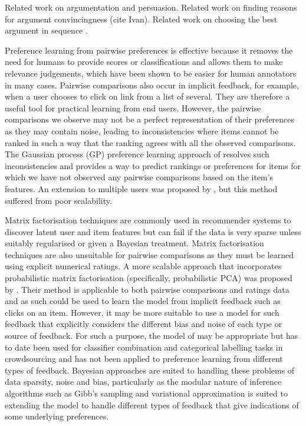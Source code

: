 Related work on argumentation and persuasion. Related work on finding reasons for argument convincingness (cite Ivan). Related work on choosing the best argument in sequence \cite{rosenfeld2016providing}\cite{monteserin2013reinforcement}. 

Preference learning from pairwise preferences is effective because it removes the need for humans to provide scores or classifications and allows them to make relevance judgements,
which have been shown to be easier for human annotators in many cases\cite{brochu_active_2007}. Pairwise comparisons also occur in implicit feedback, for example, when a user chooses to click on link from a list of several. They are therefore a useful tool for practical learning from end users. 
However, the pairwise comparisons we observe may not be a perfect representation of their preferences as they may contain noise, leading to inconsistencies where items cannot be ranked in such a way that the ranking agrees with all the observed comparisons. 
The Gaussian process (GP) preference learning approach of \cite{chu2005preference} resolves such inconsistencies and provides a way to predict rankings or preferences for 
items for which we have not observed any pairwise comparisons based on the item's features. 
An extension to multiple users was proposed by \cite{houlsby2012collaborative}, 
but this method suffered from poor scalability.

Matrix factorisation techniques are commonly used in recommender systems to discover latent
user and item features but can fail if the
data is very sparse unless suitably regularised or given a Bayesian treatment.
Matrix factorisation techniques are also unsuitable for pairwise comparisons as they 
must be learned using explicit numerical ratings.
A more scalable approach that incorporates probabilistic matrix factorisation
(specifically, probabilistic PCA) was proposed by \cite{khan2014scalable}.
Their method is applicable to both pairwise comparisons and ratings data
and as such could be used to learn the model from implicit feedback such as clicks on an item. However, it may be more suitable to use a model for such feedback that explicitly considers the different bias and noise of each type or source of feedback. For such
a purpose, the model of \cite{dawid_maximum_1979} may be appropriate but has to date
been used for classifier combination and categorical labelling tasks in crowdsourcing and has not been applied to preference learning from different types of feedback. 
Bayesian approaches are suited to handling these problems of data sparsity, noise and bias, 
particularly as the modular nature of inference algorithms such as Gibb's sampling and variational approximation is suited to extending the model to handle different types of feedback that give indications of some underlying preferences. 


